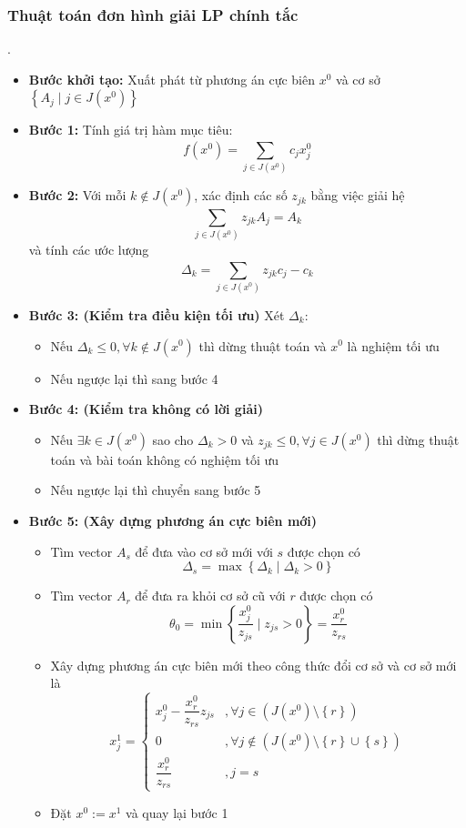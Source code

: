 \documentclass[12pt,a4paper]{article}\author{Nguyễn Nho Dũng}
\newcommand{\taphop}[1]{\left\{#1\right\}}
\newcommand{\ngoacto}[1]{\left(#1\right)}
\newcommand{\tonglanluot}[2]{\sum_{#1}^{#2}}
\begin{document}
\subsubsection{Thuật toán đơn hình giải LP chính tắc}
\begin{thuattoan}.
	\begin{itemize}
		\item \textbf{Bước khởi tạo:} Xuất phát từ phương án cực biên $x^0$ và cơ sở $\taphop{A_j \mid j\in J\ngoacto{x^0}}$
		\item \textbf{Bước 1:} Tính giá trị hàm mục tiêu: $$f\ngoacto{x^0} = \tonglanluot{j\in J\ngoacto{x^0}}{} c_jx^0_j$$
		\item \textbf{Bước 2:} Với mỗi $k \notin J\ngoacto{x^0}$, xác định các số $z_{jk}$ bằng việc giải hệ $$\tonglanluot{j\in J\ngoacto{x^0}}{} z_{jk} A_j = A_k$$ và tính các ước lượng $$\Delta_k = \tonglanluot{j\in J\ngoacto{x^0}}{} z_{jk} c_j -c_k$$
		\item \textbf{Bước 3: (Kiểm tra điều kiện tối ưu)} Xét $\Delta_k$:
		\begin{itemize}
			\item Nếu $\Delta_k \le 0, \forall k\notin J\ngoacto{x^0}$ thì dừng thuật toán và $x^0$ là nghiệm tối ưu
			\item Nếu ngược lại thì sang bước 4
		\end{itemize}
		\item \textbf{Bước 4: (Kiểm tra không có lời giải)}
		\begin{itemize}
			\item Nếu $\exists k \in J\ngoacto{x^0}$ sao cho $\Delta_k > 0$ và $z_{jk} \le 0, \forall j\in J\ngoacto{x^0}$ thì dừng thuật toán và bài toán không có nghiệm tối ưu
			\item Nếu ngược lại thì chuyển sang bước 5
		\end{itemize}
		\item \textbf{Bước 5: (Xây dựng phương án cực biên mới)}
		\begin{itemize}
			\item Tìm vector $A_s$ để đưa vào cơ sở mới với $s$ được chọn có $$\Delta_s = \max\taphop{\Delta_k \mid \Delta_k > 0}$$
			\item Tìm vector $A_r$ để đưa ra khỏi cơ sở cũ với $r$ được chọn có $$\theta_0 = \min\taphop{\dfrac{x^0_j}{z_{js}} \mid z_{js} > 0} = \dfrac{x^0_r}{z_{rs}}$$
			\item Xây dựng phương án cực biên mới theo công thức đổi cơ sở và cơ sở mới là $$x^1_j = \begin{cases}
			x^0_j -\dfrac{x^0_r}{z_{rs}}z_{js} &, \forall j\in \ngoacto{J(x^0)\setminus\taphop{r}}\\
			0 &, \forall j \notin \ngoacto{J(x^0)\setminus\taphop{r}\cup\taphop{s}}\\
			\dfrac{x^0_r}{z_{rs}} &, j = s
		\end{cases}$$
			\item Đặt $x^0 := x^1$ và quay lại bước 1
		\end{itemize}
	\end{itemize}
\end{thuattoan}
\end{document}
